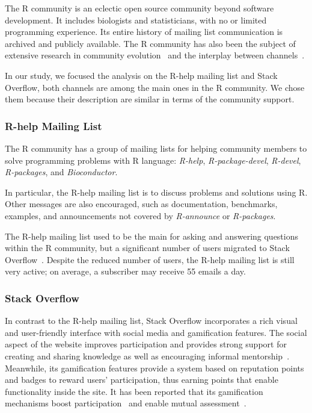     The R community is an eclectic open source community beyond software development.
    It includes biologists and statisticians, with no or limited programming experience.
    Its entire history of mailing list communication is archived and publicly available.
    The R community has also been the subject of extensive research in community evolution~\cite{German2013} and the interplay between channels~\cite{Vasilescu2014c}.

    In our study, we focused the analysis on the R-help mailing list and Stack Overflow, both channels are among the main ones in the R community.
    We chose them because their description are similar in terms of the community support.

\subsubsection{R-help Mailing List}
    The R community has a group of mailing lists for helping community members to solve programming problems with R language: \emph{R-help}, \emph{R-package-devel}, \emph{R-devel}, \emph{R-packages}, and \emph{Bioconductor}.

    In particular, the R-help mailing list is to discuss problems and solutions using R. 
    Other messages are also encouraged, such as documentation, benchmarks, examples, and announcements not covered by \emph{R-announce} or \emph{R-packages}.

    The R-help mailing list used to be the main \channel for asking and answering questions within the R community, but a significant number of users migrated to Stack Overflow~\cite{Vasilescu2014c}.
    Despite the reduced number of users, the R-help mailing list is still very active; on average, a subscriber may receive 55 emails a day.

\subsubsection{Stack Overflow}
\label{subsec:Rtag}

    In contrast to the R-help mailing list, Stack Overflow incorporates a rich visual and user-friendly interface with social media and gamification features.
    The social aspect of the website improves participation and provides strong support for creating and sharing knowledge as well as encouraging informal mentorship~\cite{Jenkins2009, Storey2014}.
    Meanwhile, its gamification features provide a system based on reputation points and badges to reward users' participation, thus earning points that enable functionality inside the site.
    It has been reported that its gamification mechanisms boost participation~\cite{Vasilescu2014} and enable mutual assessment~\cite{Singer2013}.


